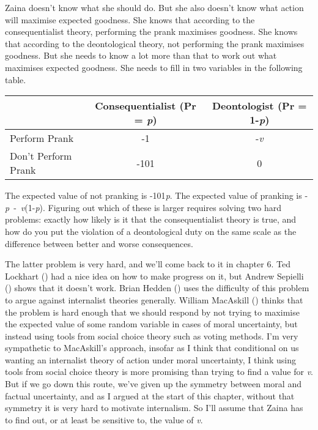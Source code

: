\documentclass[
  10pt,
  letterpaper,
  twoside]{scrbook}
\begin{document}
{Zaina} doesn't know what she should do. But she also doesn't know what
action will maximise expected goodness. She knows that according to the
consequentialist theory, performing the prank maximises goodness. She
knows that according to the deontological theory, not performing the
prank maximises goodness. But she needs to know a lot more than that to
work out what maximises expected goodness. She needs to fill in two
variables in the following table.

\begin{longtable}[]{@{}lcc@{}}
\toprule\noalign{}
& Consequentialist (Pr = \emph{p}) & Deontologist (Pr = 1-\emph{p}) \\
\midrule\noalign{}
\endhead
\bottomrule\noalign{}
\endlastfoot
Perform Prank & -1 & -\emph{v} \\
Don't Perform Prank & -101 & 0 \\
\end{longtable}

The expected value of not pranking is -101\emph{p}. The expected value
of pranking is -\emph{p}~-~\emph{v}(1-\emph{p}). Figuring out which of
these is larger requires solving two hard problems: exactly how likely
is it that the consequentialist theory is true, and how do you put the
violation of a deontological duty on the same scale as the difference
between better and worse consequences.

The latter problem is very hard, and we'll come back to it in chapter 6.
Ted Lockhart () had a nice idea on how
to make progress on it, but Andrew Sepielli
() shows that it doesn't work. Brian
Hedden () uses the difficulty of this
problem to argue against internalist theories generally. William
MacAskill () thinks that the problem
is hard enough that we should respond by not trying to maximise the
expected value of some random variable in cases of moral uncertainty,
but instead using tools from social choice theory such as voting
methods. I'm very sympathetic to MacAskill's approach, insofar as I
think that conditional on us wanting an internalist theory of action
under moral uncertainty, I think using tools from social choice theory
is more promising than trying to find a value for \emph{v}. But if we go
down this route, we've given up the symmetry between moral and factual
uncertainty, and as I argued at the start of this chapter, without that
symmetry it is very hard to motivate internalism. So I'll assume that
{Zaina} has to find out, or at least be sensitive to, the value of
\emph{v}.
\end{document}
